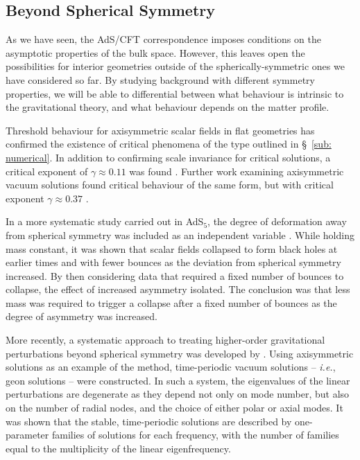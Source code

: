 
\subsection{Beyond Spherical Symmetry}
\label{sub: beyond spherical}

As we have seen, the AdS/CFT correspondence imposes conditions on the asymptotic properties of the bulk space. However, this leaves open the possibilities for interior geometries outside of the spherically-symmetric ones we have considered so far. By studying background with different symmetry properties, we will be able to differential between what behaviour is intrinsic to the gravitational theory, and what behaviour depends on the matter profile.

Threshold behaviour for axisymmetric scalar fields in flat geometries has confirmed the existence of critical phenomena of the type outlined in \S~\!\ref{sub: numerical}. In addition to confirming scale invariance for critical solutions, a critical exponent of $\gamma \approx 0.11$ was found \cite{gr-qc/0405101}. Further work examining axisymmetric vacuum solutions found critical behaviour of the same form, but with critical exponent $\gamma \approx 0.37$ \cite{Abrahams:1993wa}.

In a more systematic study carried out in AdS$_5$, the degree of deformation away from spherical symmetry was included as an independent variable \cite{1706.04199}. While holding mass constant, it was shown that scalar fields collapsed to form black holes at earlier times and with fewer bounces as the deviation from spherical symmetry increased. By then considering data that required a fixed number of bounces to collapse, the effect of increased asymmetry isolated. The conclusion was that less mass was required to trigger a collapse after a fixed number of bounces as the degree of asymmetry was increased.

More recently, a systematic approach to treating higher-order gravitational perturbations beyond spherical symmetry was developed by \cite{1701.07804}. Using axisymmetric solutions as an example of the method, time-periodic vacuum solutions -- {\it i.e.}, geon solutions -- were constructed. In such a system, the eigenvalues of the linear perturbations are degenerate as they depend not only on mode number, but also on the number of radial nodes, and the choice of either polar or axial modes. It was shown that the stable, time-periodic solutions are described by one-parameter families of solutions for each frequency, with the number of families equal to the multiplicity of the linear eigenfrequency.

